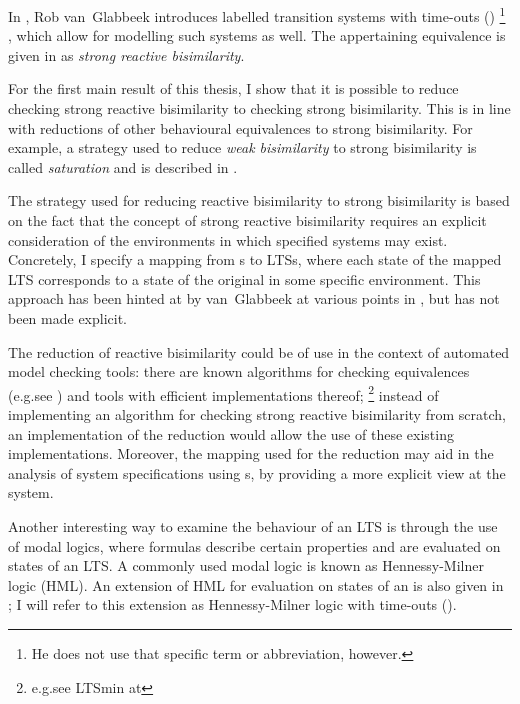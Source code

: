 \begin{isabellebody}
\begin{isamarkuptext}
\pagebreak
In \cite{vanglabbeek2021failure}, Rob van~Glabbeek introduces labelled transition systems with time-outs (\LTSt{})%
\footnote{He does not use that specific term or abbreviation, however.}%
, which allow for modelling such systems as well.
The appertaining equivalence is given in \cite{rbs} as \emph{strong reactive bisimilarity}.

For the first main result of this thesis, I show that it is possible to reduce checking strong reactive bisimilarity to checking strong bisimilarity. This is in line with reductions of other behavioural equivalences to strong bisimilarity. For example, a strategy used to reduce \emph{weak bisimilarity} to strong bisimilarity is called \emph{saturation} and is described in \cite[section 3.2.5]{advBC_algorithmics}.

The strategy used for reducing reactive bisimilarity to strong bisimilarity is based on the fact that the concept of strong reactive bisimilarity requires an explicit consideration of the environments in which specified systems may exist. Concretely, I specify a mapping from \LTSt{}s to LTSs, where each state of the mapped LTS corresponds to a state of the original \LTSt{} in some specific environment. This approach has been hinted at by van~Glabbeek at various points in \cite{rbs}, but has not been made explicit.

The reduction of reactive bisimilarity could be of use in the context of automated model checking tools: there are known algorithms for checking equivalences (e.g.\@ see \cite{advBC_algorithmics}) and tools with efficient implementations thereof;%
\footnote{e.g.\@ see LTSmin at }
instead of implementing an algorithm for checking strong reactive bisimilarity from scratch, an implementation of the reduction would allow the use of these existing implementations.
Moreover, the mapping used for the reduction may aid in the analysis of system specifications using \LTSt{}s, by providing a more explicit view at the system.

Another interesting way to examine the behaviour of an LTS is through the use of modal logics, where formulas describe certain properties and are evaluated on states of an LTS. A commonly used modal logic is known as Hennessy-Milner logic (HML). 
An extension of HML for evaluation on states of an \LTSt{} is also given in \cite{rbs}; I will refer to this extension as Hennessy-Milner logic with time-outs (\HMLt{}).


\end{isamarkuptext}
\end{isabellebody}
